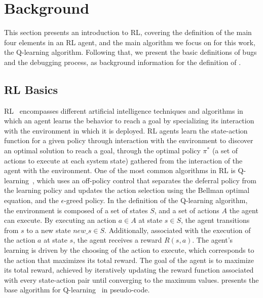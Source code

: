 
\section{Background}
\label{sec:background}

This section presents an introduction to \ac{RL}, covering the definition of the main four elements in 
an \ac{RL} agent, and the main algorithm we focus on for this work, the Q-learning algorithm. 
Following that, we present the basic definitions of bugs and the debugging process, as background 
information for the definition of \flik.

\subsection{\acl{RL} Basics}
\label{sec:rl-background}

\ac{RL}~\cite{sutton18} encompasses different artificial intelligence techniques and algorithms in 
which an agent learns the behavior to reach a goal by specializing its interaction with the 
environment in which it is deployed.
\ac{RL} agents learn the state-action function for a given policy through interaction with the 
environment to discover an optimal solution to reach a goal, through the optimal policy $\pi^*$ (a set 
of actions to execute at each system state) gathered from the interaction of the agent with the 
environment. One of the most common algorithms in \ac{RL} is Q-learning~\cite{beakcheol19}, which 
uses an off-policy control that separates the deferral policy from the learning policy and updates the 
action selection using the Bellman optimal equation, and the $\epsilon$-greed policy.  In the definition 
of the Q-learning algorithm, the environment is composed of a set of states $S$, and a set of actions 
$A$ the agent can execute. By executing an action $a\in A$ at state $s \in S$, the agent transitions 
from $s$ to a new state $new\_s \in S$. Additionally, associated with the execution of the action $a$ at 
state $s$, the agent receives a reward $R(s,a)$. The agent's learning is driven by the choosing of the 
action to execute, which corresponds to the action that maximizes its total reward. The goal of the 
agent is to maximize its total reward, achieved by iteratively updating the reward function associated 
with every state-action pair until converging to the maximum values.  presents 
the base algorithm for Q-learning~\cite{sutton18} in pseudo-code.

